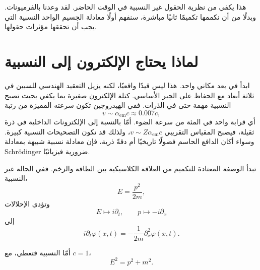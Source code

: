 \begin{classroomqa}
\end{classroomqa}

هذا يكفي من نظرية الحقول غير النسبية في الوقت الحاضر. لقد وعدنا بالفرميونات. وبدلًا من أن نكممها تكميمًا ثانيًا مباشرة، سنفهم أولًا معادلة الجسيم الواحد النسبية التي يجب أن تحققها مؤثرات حقولها.

\section{لماذا يحتاج الإلكترون إلى النسبية}

ابدأ في بعد مكاني واحد. هذا ليس قيدًا واقعيًا، لكنه يزيل التعقيد الهندسي للسبين في ثلاثة أبعاد مع الحفاظ على الجبر الأساسي. كتلة الإلكترون صغيرة بما يكفي بحيث تصبح النسبية مهمة حتى في الذرات. ففي الهيدروجين تكون سرعته المميزة من رتبة
\begin{equation}
v\sim\alpha_{\mathrm{em}}c\approx 0.007c,
\end{equation}
أي قرابة واحد في المئة من سرعة الضوء. أمّا بالنسبة إلى الإلكترونات الداخلية في ذرة ثقيلة، فيصبح المقياس التقريبي \(v\sim Z\alpha_{\mathrm{em}}c\)، ولذلك قد تكون التصحيحات النسبية كبيرة. وسواء أكان الدافع الحاسم فضولًا تاريخيًا أم دقةً ذرية، فإن معادلة نسبية شبيهة بمعادلة Schr\"odinger ضرورية فيزيائيًا.

تبدأ الوصفة المعتادة للتكميم من العلاقة الكلاسيكية بين الطاقة والزخم. ففي الحالة غير النسبية،
\begin{equation}
E=\frac{p^2}{2m},
\end{equation}
وتؤدي الإحلالات
\begin{equation}
E\mapsto i\partial_t,
\qquad
p\mapsto-i\partial_x
\end{equation}
إلى
\begin{equation}
i\partial_t\varphi(x,t)
=-\frac{1}{2m}\partial_x^2\varphi(x,t).
\end{equation}

أمّا النسبية فتعطي، مع \(c=1\)،
\begin{equation}
E^2=p^2+m^2.
\label{eq:l9-rel-dispersion}
\end{equation}

